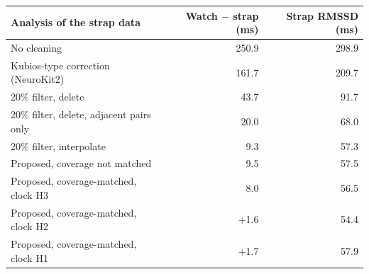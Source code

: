 \begin{tabular}{lrr}
\toprule
Analysis of the strap data & Watch $-$ strap (ms) & Strap RMSSD (ms) \\
\midrule
No cleaning & \textminus{}250.9 & 298.9 \\
Kubios-type correction (NeuroKit2) & \textminus{}161.7 & 209.7 \\
20\% filter, delete & \textminus{}43.7 & 91.7 \\
20\% filter, delete, adjacent pairs only & \textminus{}20.0 & 68.0 \\
20\% filter, interpolate & \textminus{}9.3 & 57.3 \\
Proposed, coverage not matched & \textminus{}9.5 & 57.5 \\
Proposed, coverage-matched, clock H3 & \textminus{}8.0 & 56.5 \\
Proposed, coverage-matched, clock H2 & +1.6 & 54.4 \\
Proposed, coverage-matched, clock H1 & +1.7 & 57.9 \\
\bottomrule
\end{tabular}
